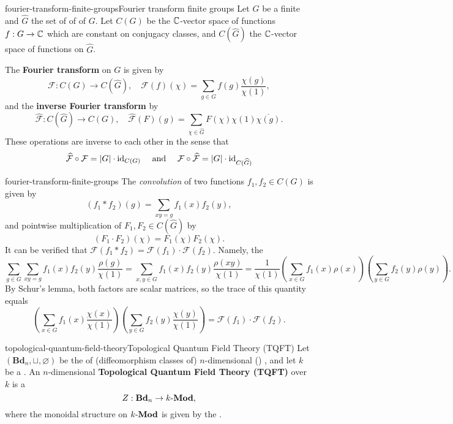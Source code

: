 \begin{topic}{fourier-transform-finite-groups}{Fourier transform finite groups}
    Let $G$ be a finite  and $\widehat{G}$ the set of  of  of $G$. Let $C(G)$ be the $\mathbb{C}$-vector space of functions $f : G \to \mathbb{C}$ which are constant on conjugacy classes, and $C(\widehat{G})$ the $\mathbb{C}$-vector space of functions on $\widehat{G}$.
    
    The \textbf{Fourier transform} on $G$ is given by
    \[ \mathcal{F} : C(G) \to C(\widehat{G}), \quad \mathcal{F}(f)(\chi) = \sum_{g \in G} f(g) \frac{\chi(g)}{\chi(1)} , \]
    and the \textbf{inverse Fourier transform} by
    \[ \widehat{\mathcal{F}} : C(\widehat{G}) \to C(G), \quad \widehat{\mathcal{F}}(F)(g) = \sum_{\chi \in \widehat{G}} F(\chi) \chi(1) \overline{\chi(g)} . \]
    These operations are inverse to each other in the sense that
    \[ \widehat{\mathcal{F}} \circ \mathcal{F} = |G| \cdot \text{id}_{C(G)} \quad \textup{ and } \quad \mathcal{F} \circ \widehat{\mathcal{F}} = |G| \cdot \text{id}_{C(\widehat{G})} \]
\end{topic}

\begin{example}{fourier-transform-finite-groups}
    The \textit{convolution} of two functions $f_1, f_2 \in C(G)$ is given by
    \[ (f_1 * f_2)(g) = \sum_{xy = g} f_1(x) f_2(y) , \]
    and pointwise multiplication of $F_1, F_2 \in C(\widehat{G})$ by
    \[ (F_1 \cdot F_2)(\chi) = F_1(\chi) F_2(\chi) . \]
    It can be verified that $\mathcal{F}(f_1 * f_2) = \mathcal{F}(f_1) \cdot \mathcal{F}(f_2)$. Namely, the
    \[ \sum_{g \in G} \sum_{xy = g} f_1(x) f_2(y) \frac{\rho(g)}{\chi(1)} = \sum_{x, y \in G} f_1(x) f_2(y) \frac{\rho(xy)}{\chi(1)} = \frac{1}{\chi(1)} \left( \sum_{x \in G} f_1(x) \rho(x) \right) \left( \sum_{y \in G} f_2(y) \rho(y) \right) . \]
    By Schur's lemma, both factors are scalar matrices, so the trace of this quantity equals
    \[ \left( \sum_{x \in G} f_1(x) \frac{\chi(x)}{\chi(1)} \right) \left( \sum_{y \in G} f_2(y) \frac{\chi(y)}{\chi(1)} \right) = \mathcal{F}(f_1) \cdot \mathcal{F}(f_2) . \]
\end{example}

\begin{topic}{topological-quantum-field-theory}{Topological Quantum Field Theory (TQFT)}
    Let $(\textbf{Bd}_n, \sqcup, \varnothing)$ be the  of (diffeomorphism classes of) $n$-dimensional () , and let $k$ be a . An $n$-dimensional \textbf{Topological Quantum Field Theory (TQFT)} over $k$ is a 
    \[ Z : \textbf{Bd}_n \to k\textup{-}\textbf{Mod} , \]
    where the monoidal structure on $k\textup{-}\textbf{Mod}$ is given by the .
\end{topic}

